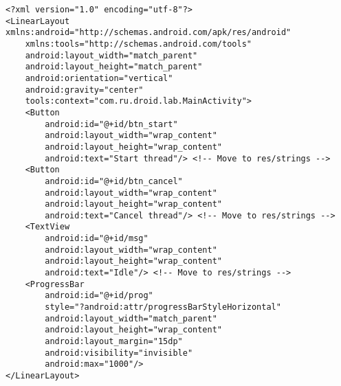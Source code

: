 \begin{lstlisting}[style=A_XML, caption={Layout for AsyncTask program}, label={listing:asynlay}]
<?xml version="1.0" encoding="utf-8"?>
<LinearLayout xmlns:android="http://schemas.android.com/apk/res/android"
    xmlns:tools="http://schemas.android.com/tools"
    android:layout_width="match_parent"
    android:layout_height="match_parent"
    android:orientation="vertical"
    android:gravity="center"
    tools:context="com.ru.droid.lab.MainActivity">
    <Button
        android:id="@+id/btn_start"
        android:layout_width="wrap_content"
        android:layout_height="wrap_content"
        android:text="Start thread"/> <!-- Move to res/strings -->
    <Button
        android:id="@+id/btn_cancel"
        android:layout_width="wrap_content"
        android:layout_height="wrap_content"
        android:text="Cancel thread"/> <!-- Move to res/strings -->
    <TextView
        android:id="@+id/msg"
        android:layout_width="wrap_content"
        android:layout_height="wrap_content"
        android:text="Idle"/> <!-- Move to res/strings -->
    <ProgressBar
        android:id="@+id/prog"
        style="?android:attr/progressBarStyleHorizontal"
        android:layout_width="match_parent"
        android:layout_height="wrap_content"
        android:layout_margin="15dp"
        android:visibility="invisible"
        android:max="1000"/>
</LinearLayout>
\end{lstlisting}

